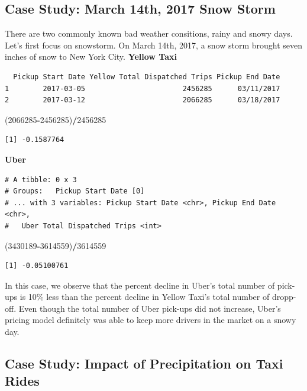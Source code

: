\documentclass[12pt,twoside]{reedthesis}
\newenvironment{Shaded}{\begin{snugshade}}{\end{snugshade}}
\newcommand{\DecValTok}[1]{\textcolor[rgb]{0.00,0.00,0.81}{#1}}
\newcommand{\OperatorTok}[1]{\textcolor[rgb]{0.81,0.36,0.00}{\textbf{#1}}}
\newcommand{\NormalTok}[1]{#1}
\theoremstyle{definition}
\theoremstyle{definition}
\theoremstyle{definition}
\theoremstyle{remark}
\begin{document}
\subsection{Case Study: March 14th, 2017 Snow
Storm}\label{case-study-march-14th-2017-snow-storm}

There are two commonly known bad weather consitions, rainy and snowy
days. Let's first focus on snowstorm. On March 14th, 2017, a snow storm
brought seven inches of snow to New York City. \textbf{Yellow Taxi}
\begin{verbatim}
  Pickup Start Date Yellow Total Dispatched Trips Pickup End Date
1        2017-03-05                       2456285      03/11/2017
2        2017-03-12                       2066285      03/18/2017
\end{verbatim}
\begin{Shaded}
\begin{Highlighting}[]
\NormalTok{(}\DecValTok{2066285}\OperatorTok{-}\DecValTok{2456285}\NormalTok{)}\OperatorTok{/}\DecValTok{2456285}
\end{Highlighting}
\end{Shaded}
\begin{verbatim}
[1] -0.1587764
\end{verbatim}
\textbf{Uber}
\begin{verbatim}
# A tibble: 0 x 3
# Groups:   Pickup Start Date [0]
# ... with 3 variables: Pickup Start Date <chr>, Pickup End Date <chr>,
#   Uber Total Dispatched Trips <int>
\end{verbatim}
\begin{Shaded}
\begin{Highlighting}[]
\NormalTok{(}\DecValTok{3430189}\OperatorTok{-}\DecValTok{3614559}\NormalTok{)}\OperatorTok{/}\DecValTok{3614559}
\end{Highlighting}
\end{Shaded}
\begin{verbatim}
[1] -0.05100761
\end{verbatim}
In this case, we observe that the percent decline in Uber's total number
of pick-ups is 10\% less than the percent decline in Yellow Taxi's total
number of dropp-off. Even though the total number of Uber pick-ups did
not increase, Uber's pricing model definitely was able to keep more
drivers in the market on a snowy day.

\subsection{Case Study: Impact of Precipitation on Taxi
Rides}\label{case-study-impact-of-precipitation-on-taxi-rides}
\end{document}
